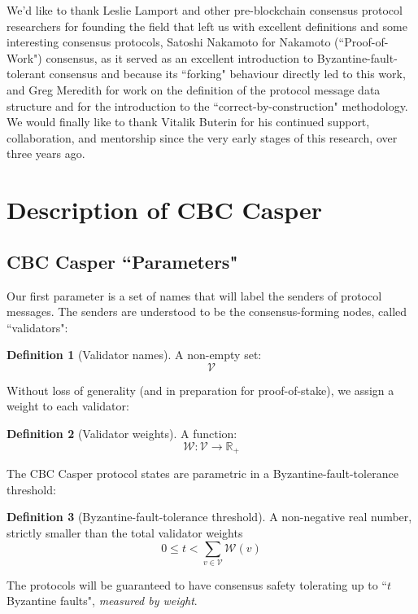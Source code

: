 \documentclass{article}
\theoremstyle{definition}
\newtheorem{defn}{Definition}[section]
\begin{document}
We'd like to thank Leslie Lamport and other pre-blockchain consensus protocol researchers for founding the field that left us with excellent definitions and some interesting consensus protocols, Satoshi Nakamoto for Nakamoto (``Proof-of-Work") consensus\cite{nakamoto}, as it served as an excellent introduction to Byzantine-fault-tolerant consensus and because its ``forking" behaviour directly led to this work, and Greg Meredith for work on the definition of the protocol message data structure and for the introduction to the ``correct-by-construction" methodology. We would finally like to thank Vitalik Buterin for his continued support, collaboration, and mentorship since the very early stages of this research, over three years ago.

\pagebreak
\section{Description of CBC Casper}

\subsection{CBC Casper ``Parameters"}

Our first parameter is a set of names that will label the senders of protocol messages. The senders are understood to be the consensus-forming nodes, called ``validators":

\begin{defn}[Validator names]
A non-empty set:
$$
\mathcal{V}
$$
\end{defn}

Without loss of generality (and in preparation for proof-of-stake), we assign a weight to each validator:

\begin{defn}[Validator weights]
A function:
$$
\mathcal{W}: \mathcal{V} \to \mathbb{R}_+
$$
\end{defn}

The CBC Casper protocol states are parametric in a Byzantine-fault-tolerance threshold:

\begin{defn}[Byzantine-fault-tolerance threshold]
A non-negative real number, strictly smaller than the total validator weights
$$0 \leq t < \sum_{v \in \mathcal{V}} \mathcal{W}(v)$$
\end{defn}

The protocols will be guaranteed to have consensus safety tolerating up to ``$t$ Byzantine faults", \emph{measured by weight}.
\end{document}

